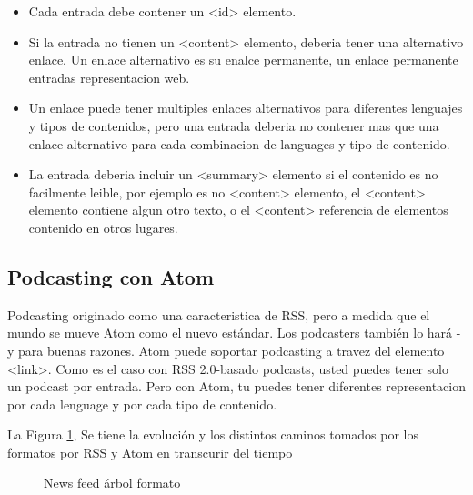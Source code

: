 \begin{itemize}

\item Cada entrada debe contener un <id> elemento.
\item Si la entrada no tienen un <content> elemento, deberia tener una alternativo
enlace. Un enlace alternativo es su enalce permanente, un enlace permanente entradas
representacion web.
\item Un enlace puede tener multiples enlaces alternativos para diferentes lenguajes
y tipos de contenidos, pero una entrada deberia no contener mas que una enlace 
alternativo para cada combinacion de languages y tipo de contenido.
\item La entrada deberia incluir un <summary> elemento si el contenido es no 
facilmente leible, por ejemplo es no <content> elemento, el <content> elemento 
contiene algun otro texto, o el <content> referencia de elementos contenido en otros
lugares.\cite{johnson2006rss}

\end{itemize}

\subsection{Podcasting con Atom}


Podcasting originado como una caracteristica de RSS, pero a medida que el mundo se
mueve Atom como el nuevo estándar. Los podcasters también lo hará - y para buenas
razones. Atom puede soportar podcasting a travez del elemento <link>. Como es el
caso con RSS 2.0-basado podcasts, usted puedes tener solo un podcast por entrada.
Pero con Atom, tu puedes tener diferentes representacion por cada lenguage y por
cada tipo de contenido.\cite{johnson2006rss}

La Figura \ref{News feed árbol formato}, Se tiene la evoluci\'{o}n y los distintos
caminos tomados por los formatos por RSS y Atom en transcurir del tiempo

\begin{figure}[!htb]
	\centering
	\caption{News feed árbol formato}
	\label{News feed árbol formato}
\end{figure}
